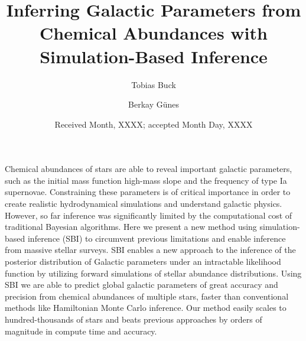 \documentclass{aa}
\begin{document}
 


   \title{Inferring Galactic Parameters from Chemical Abundances with Simulation-Based Inference}


   \author{Tobias Buck
          \and
          Berkay Günes
          }


   \date{Received Month, XXXX; accepted Month Day, XXXX}

 \abstract
   {Chemical abundances of stars are able to reveal important galactic parameters, such as the initial mass function high-mass slope and the frequency of type Ia supernovae. Constraining these parameters is of critical importance in order to create realistic hydrodynamical simulations and understand galactic physics. However, so far inference was significantly limited by the computational cost of traditional Bayesian algorithms. Here we present a new method using simulation-based inference (SBI) to circumvent previous limitations and enable inference from massive stellar surveys.
    SBI enables a new approach to the inference of the posterior distribution of Galactic parameters under an intractable likelihood function by utilizing forward simulations of stellar abundance distributions.
    Using SBI we are able to predict global galactic parameters of great accuracy and precision from chemical abundances of multiple stars, faster than conventional methods like Hamiltonian Monte Carlo inference. Our method easily scales to hundred-thousands of stars and beats previous approaches by orders of magnitude in compute time and accuracy.}
   {}
   {}
   {}
   {}

\maketitle
\end{document}
